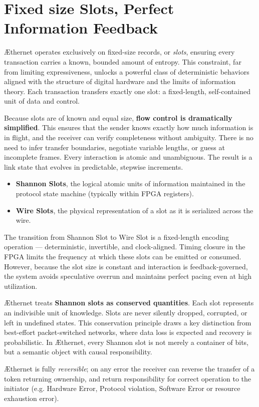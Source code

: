 \documentclass[../../../OAE-SPEC-MAIN.tex]{subfiles}
\begin{document}
\section{Fixed size Slots, Perfect Information Feedback}

\AE thernet operates exclusively on fixed-size records, or \emph{slots}, ensuring every transaction carries a known, bounded amount of entropy. This constraint, far from limiting expressiveness, unlocks a powerful class of deterministic behaviors aligned with the structure of digital hardware and the limits of information theory. Each transaction transfers exactly one slot: a fixed-length, self-contained unit of data and control.

Because slots are of known and equal size, \textbf{flow control is dramatically simplified}. This ensures that the sender knows exactly how much information is in flight, and the receiver can verify completeness without ambiguity. There is no need to infer transfer boundaries, negotiate variable lengths, or guess at incomplete frames. Every interaction is atomic and unambiguous. The result is a link state that evolves in predictable, stepwise increments.

\begin{highlightbox}[Definitions]
\begin{itemize}
\item \textbf{Shannon Slots}, the logical atomic units of information maintained in the protocol state machine (typically within FPGA registers).
\item \textbf{Wire Slots}, the physical representation of a slot as it is serialized across the wire.
\end{itemize}
\end{highlightbox}


The transition from Shannon Slot to Wire Slot is a fixed-length encoding operation — deterministic, invertible, and clock-aligned. Timing closure in the FPGA limits the frequency at which these slots can be emitted or consumed. However, because the slot size is constant and interaction is feedback-governed, the system avoids speculative overrun and maintains perfect pacing even at high utilization.

\AE thernet treats \textbf{Shannon slots as conserved quantities}. Each slot represents an indivisible unit of knowledge. Slots are never silently dropped, corrupted, or left in undefined states. This conservation principle draws a key distinction from best-effort packet-switched networks, where data loss is expected and recovery is probabilistic. In \AE thernet, every Shannon slot is not merely a container of bits, but a semantic object with causal responsibility.

\AE thernet is fully \emph{reversible}; on any error the receiver can reverse the transfer of a token returning ownership, and return responsibility  for correct operation to the initiator  (e.g. Hardware Error, Protocol violation, Software Error or resource exhaustion error). 
\end{document}
